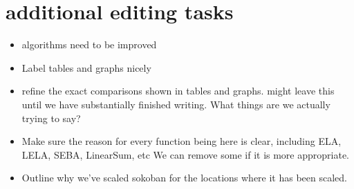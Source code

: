  
 
\section*{additional editing tasks}
\begin{itemize}
    \item algorithms need to be improved
    \item Label tables and graphs nicely
    \item refine the exact comparisons shown in tables and graphs. might leave this until we have substantially finished writing. What things are we actually trying to say?
    \item Make sure the reason for every function being here is clear, including ELA, LELA, SEBA, LinearSum, etc We can remove some if it is more appropriate.
    \item Outline why we've scaled sokoban for the locations where it has been scaled.
    
\end{itemize}
 